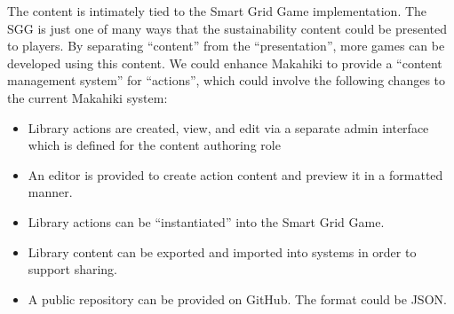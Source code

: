 The content is intimately tied to the Smart Grid Game implementation. The SGG is just one of many ways that the sustainability content could be presented to players. By separating ``content'' from the ``presentation'', more games can be developed using this content. We could enhance Makahiki to provide a ``content management system'' for ``actions'', which could involve the following changes to the current Makahiki system:
\begin{itemize}
\item Library actions are created, view, and edit via a separate admin interface which is defined for the content authoring role
\item An editor is provided to create action content and preview it in a formatted manner.
\item Library actions can be ``instantiated'' into the Smart Grid Game. 
\item Library content can be exported and imported into systems in order to support sharing. 
\item A public repository can be provided on GitHub. The format could be JSON.
\end{itemize}

